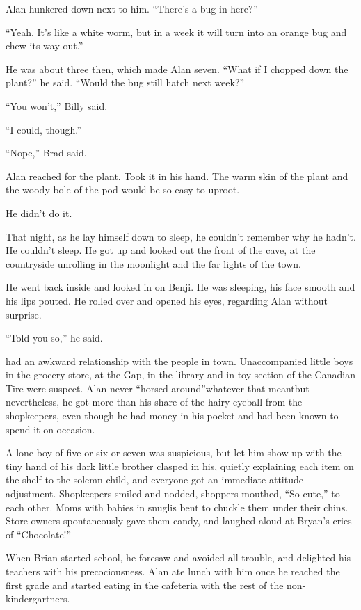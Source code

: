 Alan hunkered down next to him.  ``There's a bug in here?''

``Yeah.  It's like a white worm, but in a week it will turn into an
orange bug and chew its way out.''

He was about three then, which made Alan seven.  ``What if I chopped
down the plant?'' he said.  ``Would the bug still hatch next week?''

``You won't,'' Billy said.

``I could, though.''

``Nope,'' Brad said.

Alan reached for the plant.  Took it in his hand.  The warm skin of
the plant and the woody bole of the pod would be so easy to uproot.

He didn't do it.

That night, as he lay himself down to sleep, he couldn't remember why
he hadn't.  He couldn't sleep.  He got up and looked out the front of
the cave, at the countryside unrolling in the moonlight and the far
lights of the town.

He went back inside and looked in on Benji.  He was sleeping, his face
smooth and his lips pouted.  He rolled over and opened his eyes,
regarding Alan without surprise.

``Told you so,'' he said.

 had an awkward relationship with the people in town. 
Unaccompanied little boys in the grocery store, at the Gap, in the
library and in toy section of the Canadian Tire were suspect.  Alan
never ``horsed around''\dash{}whatever that meant\dash{}but nevertheless, he
got more than his share of the hairy eyeball from the shopkeepers,
even though he had money in his pocket and had been known to spend it
on occasion.

A lone boy of five or six or seven was suspicious, but let him show up
with the tiny hand of his dark little brother clasped in his, quietly
explaining each item on the shelf to the solemn child, and everyone
got an immediate attitude adjustment.  Shopkeepers smiled and nodded,
shoppers mouthed, ``So cute,'' to each other.  Moms with babies in
snuglis bent to chuckle them under their chins.  Store owners
spontaneously gave them candy, and laughed aloud at Bryan's cries of
``Chocolate!''

When Brian started school, he foresaw and avoided all trouble, and
delighted his teachers with his precociousness.  Alan ate lunch with
him once he reached the first grade and started eating in the
cafeteria with the rest of the non-kindergartners.

